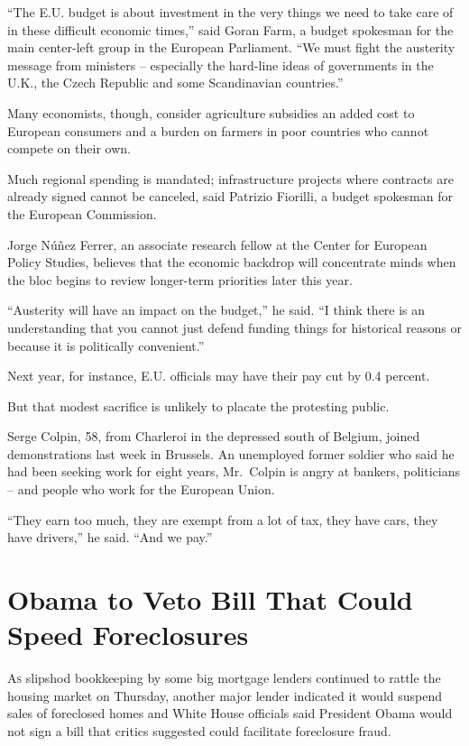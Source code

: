 ﻿\documentclass[12pt]{article}
\begin{document}
``The E.U. budget is about investment in the very things we need to take care of in these difficult
economic times,'' said Goran Farm, a budget spokesman for the main center-left group in the European
Parliament. ``We must fight the austerity message from ministers -- especially the hard-line ideas
of governments in the U.K., the Czech Republic and some Scandinavian countries.''

Many economists, though, consider agriculture subsidies an added cost to European consumers and a
burden on farmers in poor countries who cannot compete on their own.

Much regional spending is mandated; infrastructure projects where contracts are already signed
cannot be canceled, said Patrizio Fiorilli, a budget spokesman for the European Commission.

Jorge Nú\~{n}ez Ferrer, an associate research fellow at the Center for European Policy Studies,
believes that the economic backdrop will concentrate minds when the bloc begins to review
longer-term priorities later this year.

``Austerity will have an impact on the budget,'' he said. ``I think there is an understanding that
you cannot just defend funding things for historical reasons or because it is politically
convenient.''

Next year, for instance, E.U. officials may have their pay cut by 0.4 percent.

But that modest sacrifice is unlikely to placate the protesting public.

Serge Colpin, 58, from Charleroi in the depressed south of Belgium, joined demonstrations last week
in Brussels. An unemployed former soldier who said he had been seeking work for eight years,
Mr.~Colpin is angry at bankers, politicians -- and people who work for the European Union.

``They earn too much, they are exempt from a lot of tax, they have cars, they have drivers,'' he
said. ``And we pay.''

\section{Obama to Veto Bill That Could Speed Foreclosures}

\lettrine{A}{s} slipshod bookkeeping by some big mortgage lenders continued
to rattle the housing market on Thursday, another major lender indicated it would suspend sales of
foreclosed homes and White House officials said President Obama would not sign a bill that critics
suggested could facilitate foreclosure fraud.
\end{document}
